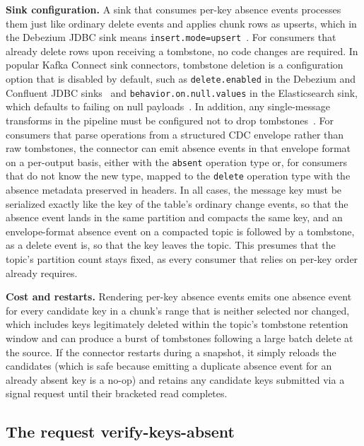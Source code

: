 \documentclass[sigconf,nonacm,10pt]{acmart}
\begin{document}
\textbf{Sink configuration.} A sink that consumes per-key absence events
processes them just like ordinary delete events and applies chunk rows as
upserts, which in the Debezium JDBC sink means
\texttt{insert.mode=upsert}~\cite{debezium_jdbc_sink}. For consumers that
already delete rows upon receiving a tombstone, no code changes are required. In popular
Kafka Connect sink connectors, tombstone deletion is a configuration option that
is disabled by default, such as \texttt{delete.enabled} in the Debezium and
Confluent JDBC sinks~\cite{debezium_jdbc_sink,confluent_sinks} and
\texttt{behavior.on.null.values} in the Elasticsearch sink, which defaults to
failing on null payloads~\cite{confluent_sinks}. In addition, any single-message
transforms in the pipeline must be configured not to drop
tombstones~\cite{debezium_event_flattening}. For consumers that parse
operations from a structured CDC envelope rather than raw tombstones, the
connector can emit absence events in that envelope format on a per-output
basis, either with the \texttt{absent} operation type or, for consumers that do not
know the new type, mapped to the \texttt{delete} operation type with the
absence metadata preserved in headers.
In all cases, the message key must be serialized exactly like the key of the
table's ordinary change events, so that the absence event lands in the same
partition and compacts the same key, and an envelope-format absence event on a
compacted topic is followed by a tombstone, as a delete event is, so that the
key leaves the topic. This presumes that the topic's partition count stays fixed, as every
consumer that relies on per-key order already requires.

\textbf{Cost and restarts.} Rendering per-key absence events emits one absence event for every candidate
key in a chunk's range that is neither selected nor
changed, which includes
keys legitimately deleted within the topic's tombstone retention window and can
produce a burst of tombstones following a large batch delete at the source. If
the connector restarts during a snapshot, it simply reloads the candidates (which is safe because emitting a duplicate absence event for an already absent
key is a no-op) and retains any candidate keys submitted via a signal
request until their bracketed read completes.

\subsection{The request verify-keys-absent}\label{sec:request}
\end{document}
